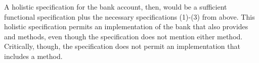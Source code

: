 A  holistic  specification for the bank account, then,
would be a sufficient functional specification
plus the necessary
specifications (1)-(3) from above. %
This holistic specification
permits an implementation of the bank that also provides  
and  methods, even though the specification does not mention either method.
Critically, though, the \Chainmail specification
does not permit an
implementation that includes a  method.

 
%
